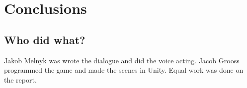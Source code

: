 \section{Conclusions}

\subsection{Who did what?}
Jakob Melnyk was wrote the dialogue and did the voice acting. Jacob Grooss programmed the game and made the scenes in Unity. Equal work was done on the report.